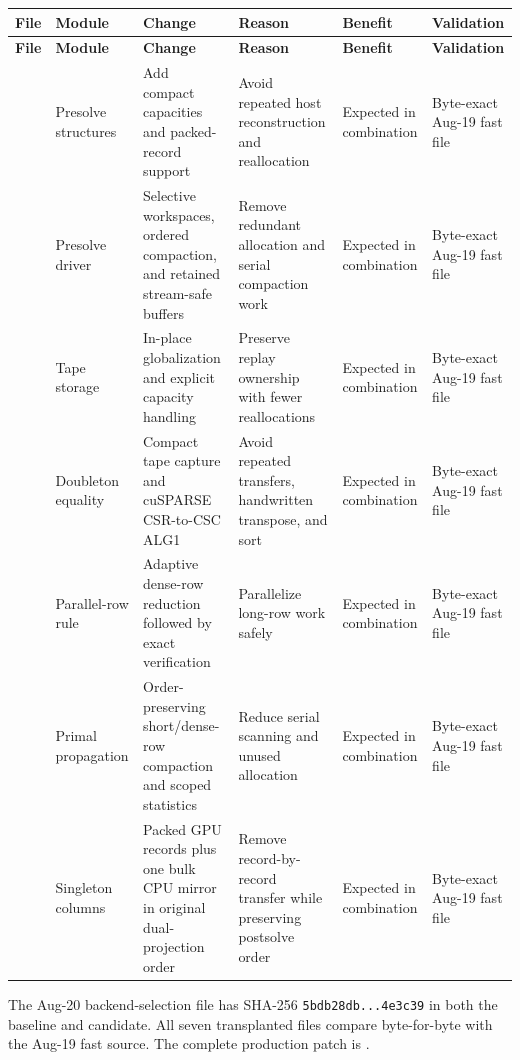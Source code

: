 \documentclass[10pt,a4paper]{article}
\begin{document}
\scriptsize
\begin{longtable}{@{}P{0.17\textwidth}P{0.14\textwidth}P{0.18\textwidth}P{0.14\textwidth}P{0.11\textwidth}P{0.10\textwidth}@{}}
\toprule
\textbf{File} & \textbf{Module} & \textbf{Change} & \textbf{Reason} & \textbf{Benefit} & \textbf{Validation}\\
\midrule
\endfirsthead
\toprule
\textbf{File} & \textbf{Module} & \textbf{Change} & \textbf{Reason} & \textbf{Benefit} & \textbf{Validation}\\
\midrule
\endhead
{} & Presolve structures & Add compact capacities and packed-record support & Avoid repeated host reconstruction and reallocation & Expected in combination & Byte-exact Aug-19 fast file\\
 & Presolve driver & Selective workspaces, ordered compaction, and retained stream-safe buffers & Remove redundant allocation and serial compaction work & Expected in combination & Byte-exact Aug-19 fast file\\
 & Tape storage & In-place globalization and explicit capacity handling & Preserve replay ownership with fewer reallocations & Expected in combination & Byte-exact Aug-19 fast file\\
 & Doubleton equality & Compact tape capture and cuSPARSE CSR-to-CSC ALG1 & Avoid repeated transfers, handwritten transpose, and sort & Expected in combination & Byte-exact Aug-19 fast file\\
 & Parallel-row rule & Adaptive dense-row reduction followed by exact verification & Parallelize long-row work safely & Expected in combination & Byte-exact Aug-19 fast file\\
 & Primal propagation & Order-preserving short/dense-row compaction and scoped statistics & Reduce serial scanning and unused allocation & Expected in combination & Byte-exact Aug-19 fast file\\
 & Singleton columns & Packed GPU records plus one bulk CPU mirror in original dual-projection order & Remove record-by-record transfer while preserving postsolve order & Expected in combination & Byte-exact Aug-19 fast file\\
\bottomrule
\end{longtable}
\normalsize

The Aug-20 backend-selection file
\allowbreak
{} has SHA-256
\texttt{5bdb28db...4e3c39} in both the baseline and candidate.  All seven
transplanted files compare byte-for-byte with the Aug-19 fast source.  The
complete production patch is
.
\end{document}
